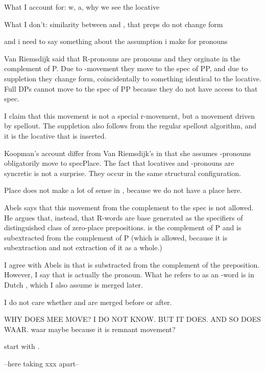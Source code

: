 \documentclass{article}
\begin{document}
What I account for: w, a, why we see the locative

What I don't: similarity between  and , that preps do not change form

and i need to say something about the assumption i make for pronouns






Van Riemsdijk said that R-pronouns are pronouns and they orginate in the complement of P. Due to -movement they move to the spec of PP, and due to suppletion they change form, coincidentally to something identical to the locative. Full DPs cannot move to the spec of PP because they do not have access to that spec.

I claim that this movement is not a special r-movement, but a movement driven by spellout. The suppletion also follows from the regular spellout algorithm, and it is the locative that is inserted.


Koopman's account differ from Van Riemsdijk's in that she assumes -pronouns obligatorily move to specPlace. The fact that locatives and -pronouns are syncretic is not a surprise. They occur in the same structural configuration.

Place does not make a lot of sense in , because we do not have a place here.

Abels says that this movement from the complement to the spec is not allowed. He argues that, instead, that R-words are base generated as the specifiers of distinguished class of zero-place prepositions.  is the complement of P and is subextracted from the complement of P (which is allowed, because it is subextraction and not extraction of it as a whole.)

I agree with Abels in that  is substracted from the complement of the preposition. However, I say that  is actually the pronoun. What he refers to as an -word is in Dutch , which I also assume is merged later.




I do not care whether  and  are merged before or after.

WHY DOES MEE MOVE? I DO NOT KNOW.
BUT IT DOES.
AND SO DOES WAAR.
waar maybe because it is remnant movement?




start with .


--here taking xxx apart--
\end{document}
